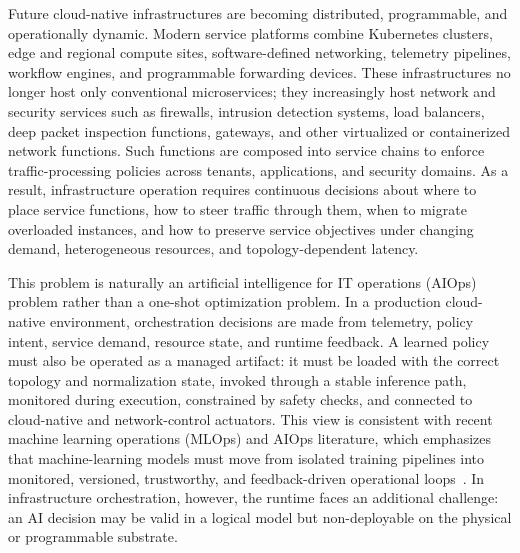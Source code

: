 \documentclass[final,5p]{elsarticle}
\newcommand{\rev}[1]{\textcolor{revisiongreen}{#1}}
\begin{document}
Future cloud-native infrastructures are becoming distributed, programmable, and operationally dynamic. Modern service platforms combine Kubernetes clusters, edge and regional compute sites, software-defined networking, telemetry pipelines, workflow engines, and programmable forwarding devices. These infrastructures no longer host only conventional microservices; they increasingly host network and security services such as firewalls, intrusion detection systems, load balancers, deep packet inspection functions, gateways, and other virtualized or containerized network functions. Such functions are composed into service chains to enforce traffic-processing policies across tenants, applications, and security domains. As a result, infrastructure operation requires continuous decisions about where to place service functions, how to steer traffic through them, when to migrate overloaded instances, and how to preserve service objectives under changing demand, heterogeneous resources, and topology-dependent latency.

This problem is naturally an \rev{artificial intelligence for IT operations (AIOps)} problem rather than a one-shot optimization problem. In a production cloud-native environment, orchestration decisions are made from telemetry, policy intent, service demand, resource state, and runtime feedback. A learned policy must also be operated as a managed artifact: it must be loaded with the correct topology and normalization state, invoked through a stable inference path, monitored during execution, constrained by safety checks, and connected to cloud-native and network-control actuators. This view is consistent with recent \rev{machine learning operations (MLOps)} and AIOps literature, which emphasizes that machine-learning models must move from isolated training pipelines into monitored, versioned, trustworthy, and feedback-driven operational loops~\cite{kreuzberger2023mlops,diazdearcaya2024joint,eken2025mlops,bayram2025trustworthy,zhang2025aiopsllm,eramo2024architecture}. In infrastructure orchestration, however, the runtime faces an additional challenge: an AI decision may be valid in a logical model but non-deployable on the physical or programmable substrate.
\end{document}
